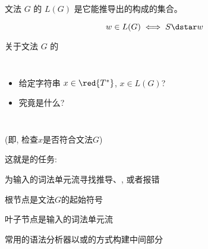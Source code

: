 \begin{frame}{}
  \begin{definition}[文法$G$生成的语言 $L(G)$]
    文法 $G$ 的 $L(G)$ 是它能推导出的构成的集合。

    \[
      w \in L(G) \iff S \dstar w
    \]
  \end{definition}
\end{frame}

\begin{frame}{}
  \begin{center}
    关于文法 $G$ 的
  \end{center}

  \vspace{0.60cm}
  \begin{columns}
      \begin{itemize}
        \setlength{\itemsep}{15pt}
        \item {}
          给定字符串 $x \in \red{T^{\ast}}$, $x \in L(G)$?
        \item {} 究竟是什么?
      \end{itemize}
  \end{columns}
\end{frame}

\begin{frame}{}
  \begin{center}

    \vspace{0.20cm}
    (即, 检查$x$是否符合文法$G$)

    \pause
    \vspace{1.00cm}
    这就是的任务:

    \vspace{0.30cm}
    为输入的词法单元流寻找推导、, 或者报错
  \end{center}
\end{frame}

\begin{frame}{}
  \begin{center}
    根节点是文法$G$的起始符号


    叶子节点是输入的词法单元流

    \vspace{0.50cm}
    常用的语法分析器以或的方式构建中间部分
  \end{center}
\end{frame}

